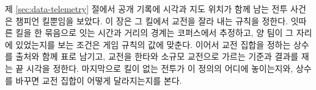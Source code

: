 제 \ref{sec:data-telemetry} 절에서 공개 기록에 시각과 지도 위치가 함께 남는 전투 사건은 챔피언 킬뿐임을 보았다. 이 장은 그 킬에서 교전을 잘라 내는 규칙을 정한다. 잇따른 킬을 한 묶음으로 잇는 시간과 거리의 경계는 코퍼스에서 추정하고, 양 팀이 그 자리에 있었는지를 보는 조건은 게임 규칙의 값에 맞춘다. 이어서 교전 집합을 정하는 상수를 출처와 함께 표로 남기고, 교전을 한타와 소규모 교전으로 가르는 기준과 결과를 재는 끝 시각을 정한다. 마지막으로 킬이 없는 전투가 이 정의의 어디에 놓이는지와, 상수를 바꾸면 교전 집합이 어떻게 달라지는지를 본다.
